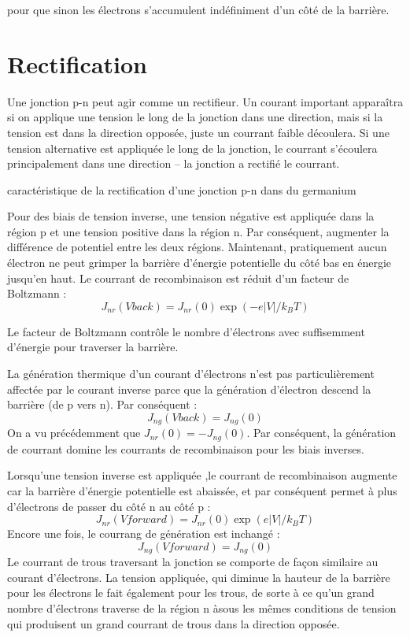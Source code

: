pour que sinon les électrons s'accumulent indéfiniment d'un côté de la barrière.

\section{Rectification}

Une jonction p-n peut agir comme un rectifieur. Un courant important apparaîtra
si on applique une tension le long de la jonction dans une direction, mais si la
tension est dans la direction opposée, juste un courrant faible découlera. Si une
tension alternative est appliquée le long de la jonction, le courrant s'écoulera
principalement dans une direction -- la jonction a rectifié le courrant.

\begin{marginfigure}
    \TODO
    \caption{caractéristique de la rectification d'une jonction p-n dans du
    germanium}
    \label{caracpn}
\end{marginfigure}

Pour des biais de tension inverse, une tension négative est appliquée dans la
région p et une tension positive dans la région n. Par conséquent, augmenter la
différence de potentiel entre les deux régions. Maintenant, pratiquement aucun
électron ne peut grimper la barrière d'énergie potentielle du côté bas en énergie
jusqu'en haut. Le courrant de recombinaison est réduit d'un facteur de Boltzmann
:
\begin{equation}
    J_{nr}(V back) = J_{nr}(0) \exp (-e|V|/k_BT)
\end{equation}

Le facteur de Boltzmann contrôle le nombre d'électrons avec suffisemment
d'énergie pour traverser la barrière.

La génération thermique d'un courant d'électrons n'est pas particulièrement
affectée par le courant inverse parce que la génération d'électron descend la
barrière (de p vers n). Par conséquent :
\begin{equation}
    J_{ng}(V back)=J_{ng}(0)
\end{equation}
On a vu précédemment que $J_{nr}(0) = -J_{ng}(0)$. Par conséquent, la génération
de courrant domine les courrants de recombinaison pour les biais inverses.

Lorsqu'une tension inverse est appliquée ,le courrant de recombinaison augmente
car la barrière d'énergie potentielle est abaissée, et par conséquent permet à
plus d'électrons de passer du côté n au côté p :
\begin{equation}
    J_{nr}(V forward) = J_{nr}(0) \exp (e|V|/k_BT)
\end{equation}
Encore une fois, le courrang de génération est inchangé :
\begin{equation}
    J_{ng}(V forward) = J_{ng}(0)
\end{equation}
Le courrant de trous traversant la jonction se comporte de façon similaire au
courant d'électrons. La tension appliquée, qui diminue la hauteur de la barrière
pour les électrons le fait également pour les trous, de sorte à ce qu'un grand
nombre d'électrons traverse de la région n àsous les mêmes conditions de tension
qui produisent un grand courrant de trous dans la direction opposée.

